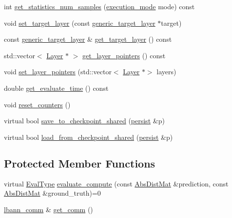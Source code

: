 \begin{DoxyCompactItemize}
\item 
int \hyperlink{classlbann_1_1metric_a489feb28d318bd8405133f9f8c94cc10}{get\+\_\+statistics\+\_\+num\+\_\+samples} (\hyperlink{base_8hpp_a2781a159088df64ed7d47cc91c4dc0a8}{execution\+\_\+mode} mode) const
\item 
void \hyperlink{classlbann_1_1metric_a8367719e2c7816a4c718c049ea97b709}{set\+\_\+target\+\_\+layer} (const \hyperlink{classlbann_1_1generic__target__layer}{generic\+\_\+target\+\_\+layer} $\ast$target)
\item 
const \hyperlink{classlbann_1_1generic__target__layer}{generic\+\_\+target\+\_\+layer} \& \hyperlink{classlbann_1_1metric_aba7f7a12aeba6619f7b4330e9075f76e}{get\+\_\+target\+\_\+layer} () const
\item 
std\+::vector$<$ \hyperlink{classlbann_1_1Layer}{Layer} $\ast$ $>$ \hyperlink{classlbann_1_1metric_a7f97c998fa64475f9ef7f066237b0695}{get\+\_\+layer\+\_\+pointers} () const
\item 
void \hyperlink{classlbann_1_1metric_a5de0c336b93f2c03f37f38047d401f99}{set\+\_\+layer\+\_\+pointers} (std\+::vector$<$ \hyperlink{classlbann_1_1Layer}{Layer} $\ast$$>$ layers)
\item 
double \hyperlink{classlbann_1_1metric_a686239cad1f25628c9b298f9233cc9f3}{get\+\_\+evaluate\+\_\+time} () const
\item 
void \hyperlink{classlbann_1_1metric_ab93708cd870277eb7865655e075620c9}{reset\+\_\+counters} ()
\item 
virtual bool \hyperlink{classlbann_1_1metric_a9728b02a240dfd9faa61b7dfeb3feede}{save\+\_\+to\+\_\+checkpoint\+\_\+shared} (\hyperlink{classlbann_1_1persist}{persist} \&p)
\item 
virtual bool \hyperlink{classlbann_1_1metric_ab3d1ec8247352467790be036a07cfc2b}{load\+\_\+from\+\_\+checkpoint\+\_\+shared} (\hyperlink{classlbann_1_1persist}{persist} \&p)
\end{DoxyCompactItemize}
\subsection*{Protected Member Functions}
\begin{DoxyCompactItemize}
\item 
virtual \hyperlink{base_8hpp_a3266f5ac18504bbadea983c109566867}{Eval\+Type} \hyperlink{classlbann_1_1metric_aab79147ff480675db2e01d7a889a4296}{evaluate\+\_\+compute} (const \hyperlink{base_8hpp_a9a697a504ae84010e7439ffec862b470}{Abs\+Dist\+Mat} \&prediction, const \hyperlink{base_8hpp_a9a697a504ae84010e7439ffec862b470}{Abs\+Dist\+Mat} \&ground\+\_\+truth)=0
\item 
\hyperlink{classlbann_1_1lbann__comm}{lbann\+\_\+comm} \& \hyperlink{classlbann_1_1metric_a464120720df6bfdf91bffe353e562964}{get\+\_\+comm} ()
\end{DoxyCompactItemize}
